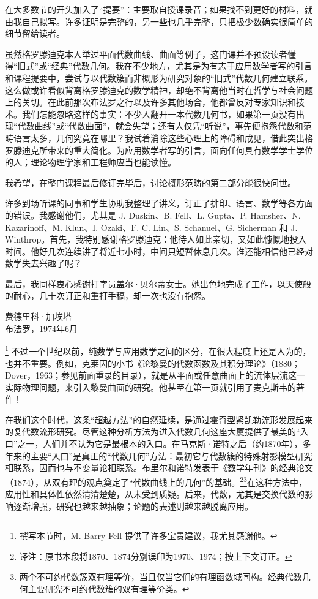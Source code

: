 在大多数节的开头加入了“提要”：主要取自授课录音；如果找不到更好的材料，就由我自己拟写。许多证明是完整的，另一些也几乎完整，只把极少数确实很简单的细节留给读者。

虽然格罗滕迪克本人举过平面代数曲线、曲面等例子，这门课并不预设读者懂得“旧式”或“经典”代数几何。我在不少地方，尤其是为有志于应用数学者写的引言和课程提要中，尝试与以代数簇而非概形为研究对象的“旧式”代数几何建立联系。这么做或许看似背离格罗滕迪克的数学精神，却绝不背离他当时在哲学与社会问题上的关切。在此前那次布法罗之行以及许多其他场合，他都曾反对专家知识和技术。我们怎能忽略这样的事实：不少人翻开一本代数几何书，如果第一页没有出现“代数曲线”或“代数曲面”，就会失望；还有人仅凭“听说”，事先便抱怨代数和范畴语言太多，几何究竟在哪里？我试着消除这些心理上的障碍和成见，借此突出格罗滕迪克所带来的重大简化。为应用数学者写的引言，面向任何具有数学学士学位的人；理论物理学家和工程师应当也能读懂。

我希望，在整门课程最后修订完毕后，讨论概形范畴的第二部分能很快问世。

许多到场听课的同事和学生协助我整理了讲义，订正了排印、语言、数学等各方面的错误。我感谢他们，尤其是 J. Duskin、B. Fell、L. Gupta、P. Hamsher、N. Kazarinoff、M. Klun、I. Ozaki、F. C. Lin、S. Schanuel、G. Sicherman 和 J. Winthrop。首先，我特别感谢格罗滕迪克：他待人如此亲切，又如此慷慨地投入时间。他好几次连续讲了将近七小时，中间只短暂休息几次。谁还能相信他已经对数学失去兴趣了呢？

最后，我同样衷心感谢打字员盖尔·贝尔蒂女士。她出色地完成了工作，以天使般的耐心，几十次订正和重打手稿，却一次也没有抱怨。
\begin{flushright}
费德里科·加埃塔\\
布法罗，1974年6月
\end{flushright}

\footnote{撰写本节时，M. Barry Fell 提供了许多宝贵建议，我尤其感谢他。}
不过一个世纪以前，纯数学与应用数学之间的区分，在很大程度上还是人为的，也并不重要。例如，克莱因的小书《论黎曼的代数函数及其积分理论》（1880；Dover，1963；参见前面重录的目录），就是从平面或任意曲面上的流体层流这一实际物理问题，来引入黎曼曲面的研究。他甚至在第一页就引用了麦克斯韦的著作！

在我们这个时代，这条“超越方法”的自然延续，是通过霍奇型紧凯勒流形发展起来的复代数流形研究。尽管这种分析方法为进入代数几何这座大厦提供了最美的“入口”之一，人们并不认为它是最根本的入口。在马克斯·诺特之后（约1870年），多年来的主要“入口”是真正的“代数几何”方法：最初它与代数簇的特殊射影模型研究相联系，因而也与不变量论相联系。布里尔和诺特发表于《数学年刊》的经典论文（1874），从双有理的观点奠定了“代数曲线上的几何”的基础。\footnote{译注：原书本段将1870、1874分别误印为1970、1974；按上下文订正。}\footnote{两个不可约代数簇双有理等价，当且仅当它们的有理函数域同构。经典代数几何主要研究不可约代数簇的双有理等价类。}在这种方法中，应用性和具体性依然清清楚楚，从未受到质疑。后来，代数，尤其是交换代数的影响逐渐增强，研究也越来越抽象；论题的表述则越来越脱离应用。

